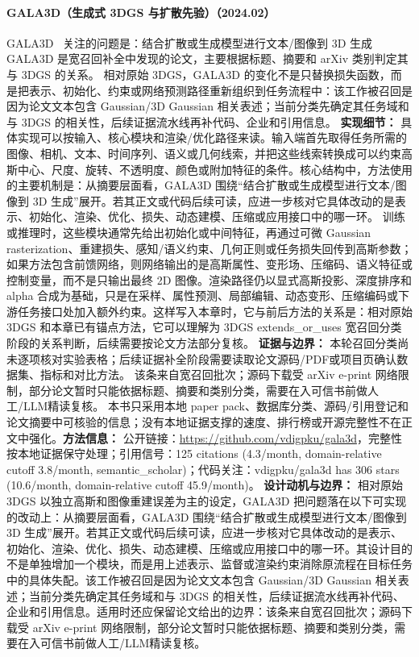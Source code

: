 \paragraph{GALA3D（生成式 3DGS 与扩散先验）（2024.02）}
GALA3D~\cite{2402_07207} 关注的问题是：结合扩散或生成模型进行文本/图像到 3D 生成 GALA3D 是宽召回补全中发现的论文，主要根据标题、摘要和 arXiv 类别判定其与 3DGS 的关系。
相对原始 3DGS，GALA3D 的变化不是只替换损失函数，而是把表示、初始化、约束或网络预测路径重新组织到任务流程中：该工作被召回是因为论文文本包含 Gaussian/3D Gaussian 相关表述；当前分类先确定其任务域和与 3DGS 的相关性，后续证据流水线再补代码、企业和引用信息。
\textbf{实现细节：} 具体实现可以按输入、核心模块和渲染/优化路径来读。输入端首先取得任务所需的图像、相机、文本、时间序列、语义或几何线索，并把这些线索转换成可以约束高斯中心、尺度、旋转、不透明度、颜色或附加特征的条件。核心结构中，方法使用的主要机制是：从摘要层面看，GALA3D 围绕“结合扩散或生成模型进行文本/图像到 3D 生成”展开。若其正文或代码后续可读，应进一步核对它具体改动的是表示、初始化、渲染、优化、损失、动态建模、压缩或应用接口中的哪一环。 训练或推理时，这些模块通常先给出初始化或中间特征，再通过可微 Gaussian rasterization、重建损失、感知/语义约束、几何正则或任务损失回传到高斯参数；如果方法包含前馈网络，则网络输出的是高斯属性、变形场、压缩码、语义特征或控制变量，而不是只输出最终 2D 图像。渲染路径仍以显式高斯投影、深度排序和 alpha 合成为基础，只是在采样、属性预测、局部编辑、动态变形、压缩编码或下游任务接口处加入额外约束。这样写入本章时，它与前后方法的关系是：相对原始 3DGS 和本章已有锚点方法，它可以理解为 3DGS extends\_or\_uses 宽召回分类阶段的关系判断，后续需要按论文方法部分复核。
\textbf{证据与边界：} 本轮召回分类尚未逐项核对实验表格；后续证据补全阶段需要读取论文源码/PDF或项目页确认数据集、指标和对比方法。 该条来自宽召回批次；源码下载受 arXiv e-print 网络限制，部分论文暂时只能依据标题、摘要和类别分类，需要在入可信书前做人工/LLM精读复核。 本书只采用本地 paper pack、数据库分类、源码/引用登记和论文摘要中可核验的信息；没有本地证据支撑的速度、排行榜或开源完整性不在正文中强化。\textbf{方法信息：} 公开链接：\url{https://github.com/vdigpku/gala3d}，完整性按本地证据保守处理；引用信号：125 citations (4.3/month, domain-relative cutoff 3.8/month, semantic\_scholar)；代码关注：vdigpku/gala3d has 306 stars (10.6/month, domain-relative cutoff 45.9/month)。
\textbf{设计动机与边界：} 相对原始 3DGS 以独立高斯和图像重建误差为主的设定，GALA3D 把问题落在以下可实现的改动上：从摘要层面看，GALA3D 围绕“结合扩散或生成模型进行文本/图像到 3D 生成”展开。若其正文或代码后续可读，应进一步核对它具体改动的是表示、初始化、渲染、优化、损失、动态建模、压缩或应用接口中的哪一环。其设计目的不是单独增加一个模块，而是用上述表示、监督或渲染约束消除原流程在目标任务中的具体失配。该工作被召回是因为论文文本包含 Gaussian/3D Gaussian 相关表述；当前分类先确定其任务域和与 3DGS 的相关性，后续证据流水线再补代码、企业和引用信息。适用时还应保留论文给出的边界：该条来自宽召回批次；源码下载受 arXiv e-print 网络限制，部分论文暂时只能依据标题、摘要和类别分类，需要在入可信书前做人工/LLM精读复核。
